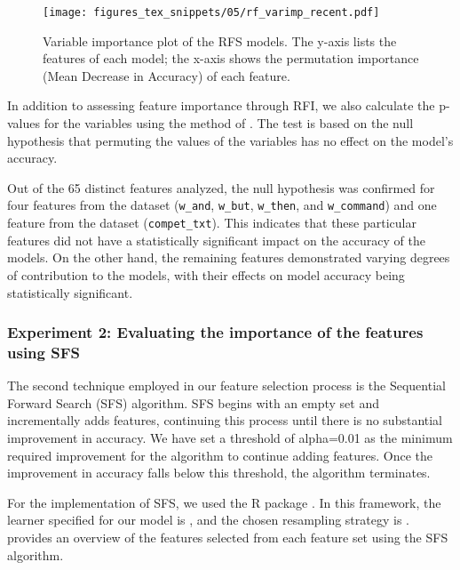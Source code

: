 \begin{figure}
	\texttt{[image: figures\_tex\_snippets/05/rf\_varimp\_recent.pdf]}
	\caption[Variable importance plot of the RFS models.]{Variable importance plot of the RFS models. The y-axis lists the features of each model; the x-axis shows the permutation importance (Mean Decrease in Accuracy) of each feature.}
	\label{fig:c5_varimp_3}
\end{figure}

In addition to assessing feature importance through RFI, we also calculate the p-values for the variables using the method of \citet{altmann2010permutation} . The test is based on the null hypothesis that permuting the values of the variables has no effect on the model's accuracy.

Out of the 65 distinct features analyzed, the null hypothesis was confirmed for four features from the  dataset (\texttt{w\_and}, \texttt{w\_but}, \texttt{w\_then}, and \texttt{w\_command}) and one feature from the  dataset (\texttt{compet\_txt}). This indicates that these particular features did not have a statistically significant impact on the accuracy of the models. On the other hand, the remaining features demonstrated varying degrees of contribution to the models, with their effects on model accuracy being statistically significant.

\subsubsection{Experiment 2: Evaluating the importance of the features using SFS}\label{subsec:ffs}

The second technique employed in our feature selection process is the Sequential Forward Search (SFS) algorithm. SFS begins with an empty set and incrementally adds features, continuing this process until there is no substantial improvement in accuracy. We have set a threshold of alpha=0.01 as the minimum required improvement for the algorithm to continue adding features. Once the improvement in accuracy falls below this threshold, the algorithm terminates.

For the implementation of SFS, we used the R package  \citep{bischl2016mlr}. In this framework, the learner specified for our model is , and the chosen resampling strategy is .  provides an overview of the features selected from each feature set using the SFS algorithm.

